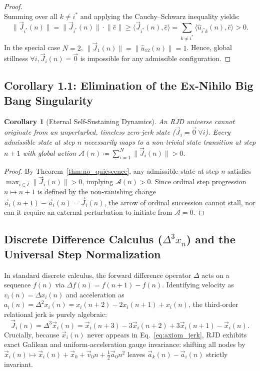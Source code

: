 \documentclass[11pt,a4paper]{article}
\theoremstyle{plain}
\newtheorem{corollary}{Corollary}[theorem]
\theoremstyle{definition}
\theoremstyle{remark}
\begin{document}
\begin{proof}
\begin{equation}
\end{equation}
Summing over all $k \neq i^*$ and applying the Cauchy--Schwarz inequality yields:
\begin{equation}
\lVert \vec{J}_{i^*}(n) \rVert = \lVert \vec{J}_{i^*}(n) \rVert \cdot \lVert \hat{e} \rVert \ge \langle \vec{J}_{i^*}(n), \hat{e} \rangle = \sum_{k \neq i^*} \langle \hat{u}_{i^* k}(n), \hat{e} \rangle > 0.
\end{equation}
In the special case $N=2$, $\lVert \vec{J}_1(n) \rVert = \lVert \hat{u}_{12}(n) \rVert = 1$. Hence, global stillness $\forall i, \vec{J}_i(n) = \vec{0}$ is impossible for any admissible configuration.
\end{proof}

\subsection{Corollary 1.1: Elimination of the Ex-Nihilo Big Bang Singularity}
\begin{corollary}[Eternal Self-Sustaining Dynamics]
\label{cor:no_big_bang}
An RJD universe cannot originate from an unperturbed, timeless zero-jerk state ($\vec{J}_i = \vec{0} \ \forall i$). Every admissible state at step $n$ necessarily maps to a non-trivial state transition at step $n+1$ with global action $\mathcal{A}(n) \coloneqq \sum_{i=1}^N \lVert \vec{J}_i(n) \rVert > 0$.
\end{corollary}
\begin{proof}
By Theorem~\ref{thm:no_quiescence}, any admissible state at step $n$ satisfies $\max_{i \in I} \lVert \vec{J}_i(n) \rVert > 0$, implying $\mathcal{A}(n) > 0$. Since ordinal step progression $n \mapsto n+1$ is defined by the non-vanishing change $\vec{a}_i(n+1) - \vec{a}_i(n) = \vec{J}_i(n)$, the arrow of ordinal succession cannot stall, nor can it require an external perturbation to initiate from $\mathcal{A} = 0$.
\end{proof}


\subsection{Discrete Difference Calculus ($\Delta^3 x_n$) and the Universal Step Normalization}
In standard discrete calculus, the forward difference operator $\Delta$ acts on a sequence $f(n)$ via $\Delta f(n) = f(n+1) - f(n)$. Identifying velocity as $v_i(n) = \Delta x_i(n)$ and acceleration as $a_i(n) = \Delta^2 x_i(n) = x_i(n+2) - 2x_i(n+1) + x_i(n)$, the third-order relational jerk is purely algebraic:
\begin{equation}
\vec{J}_i(n) = \Delta^3 \vec{x}_i(n) = \vec{x}_i(n+3) - 3\vec{x}_i(n+2) + 3\vec{x}_i(n+1) - \vec{x}_i(n).
\end{equation}
Crucially, because $\vec{x}_i(n)$ never appears in Eq.~\eqref{eq:axiom_jerk}, RJD exhibits exact Galilean and uniform-acceleration gauge invariance: shifting all nodes by $\vec{x}_i(n) \mapsto \vec{x}_i(n) + \vec{x}_0 + \vec{v}_0 n + \frac{1}{2}\vec{a}_0 n^2$ leaves $\vec{a}_k(n) - \vec{a}_i(n)$ strictly invariant.
\newpage
\end{document}
